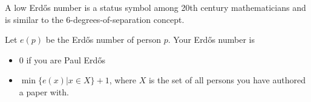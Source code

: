 \documentclass[12pt]{article}
\begin{document}
A low Erd\H{o}s number is a status symbol among 20th century mathematicians and is similar to the 6-degrees-of-separation concept.

Let $e(p)$ be the Erd\H{o}s number of person $p$.  Your Erd\H{o}s number is 

\begin{itemize}
\item 0 if you are Paul Erd\H{o}s
\item $\min\{e(x) \vert x\in X\} + 1$, where $X$ is the set of all persons you have authored a paper with.
\end{itemize}
\end{document}
